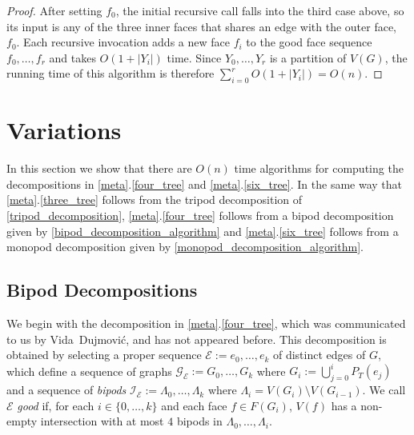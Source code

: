 \documentclass{patmorin}
\begin{document}
\begin{proof}
After setting $f_0$, the initial recursive call falls into the third case above, so its input is any of the three inner faces that shares an edge with the outer face, $f_0$.  Each recursive invocation adds a new face $f_i$ to the good face sequence $f_0,\ldots,f_{r}$ and takes $O(1+|Y_i|)$ time.  Since $Y_0,\ldots,Y_{r}$ is a partition of $V(G)$, the running time of this algorithm is therefore $\sum_{i=0}^{r} O(1+|Y_i|) = O(n)$.
\end{proof}


\section{Variations}
\label{variants}

In this section we show that there are $O(n)$ time algorithms for computing the decompositions in \cref{meta}.\ref{four_tree} and \cref{meta}.\ref{six_tree}.  In the same way that \cref{meta}.\ref{three_tree} follows from the tripod decomposition of \cref{tripod_decomposition}, \cref{meta}.\ref{four_tree} follows from a bipod decomposition given by \cref{bipod_decomposition_algorithm} and \cref{meta}.\ref{six_tree} follows from a monopod decomposition given by \cref{monopod_decomposition_algorithm}.




%

\subsection{Bipod Decompositions}

We begin with the decomposition in \cref{meta}.\ref{four_tree}, which was communicated to us by Vida~Dujmović, and has not appeared before.  This decomposition is obtained by selecting a proper sequence $\mathcal{E}:=e_0,\ldots,e_k$ of distinct edges of $G$, which define a sequence of graphs $\mathcal{G_E}:=G_{0},\ldots,G_k$ where $G_i:=\bigcup_{j=0}^i P_T(e_j)$ and a sequence of \emph{bipods} $\mathcal{I_E}:=\Lambda_0,\ldots,\Lambda_k$ where $\Lambda_i=V(G_i)\setminus V(G_{i-1})$.  We call $\mathcal{E}$ \emph{good} if, for each $i\in\{0,\ldots,k\}$ and each face $f\in F(G_i)$, $V(f)$ has a non-empty intersection with at most $4$ bipods in $\Lambda_0,\ldots,\Lambda_i$.
\end{document}
